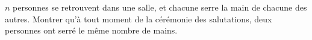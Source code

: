 $n$ personnes se retrouvent dans une salle, et chacune serre la main de chacune des autres. Montrer qu'à tout moment de la cérémonie des salutations, deux personnes ont serré le même nombre de mains.
